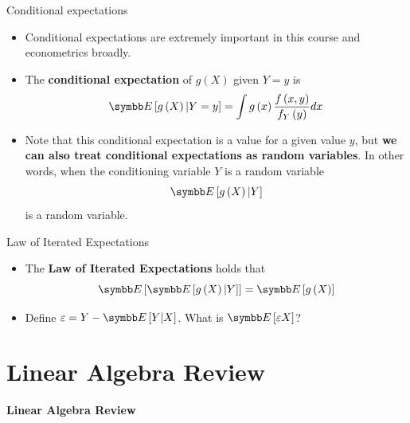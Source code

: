 \documentclass[aspectratio=169,11pt]{beamer}
\begin{document}
\begin{frame}{Conditional expectations}
\begin{itemize}
	\item Conditional expectations are extremely important in this course and econometrics broadly. 
	
	\medskip
	\item The {\bf conditional expectation} of $g\left(X\right)$ given $Y=y$ is\[
		\E\left[g\left( X\right) | Y=y\right] = \int g\left(x\right) \frac{f\left(x,y\right)}{f_{Y}\left(y\right)}dx
	\]
	
	\medskip
	\item Note that this conditional expectation is a value for a given value $y$, but {\bf we can also treat conditional
			expectations as random variables}. In other words, when the conditioning variable $Y$ is a random variable\[
			\E\left[g\left( X\right) | Y \right] 
			\]
			is a random variable.
			
\end{itemize}
\end{frame}





\begin{frame}{Law of Iterated Expectations}
\begin{itemize}
	\item The {\bf Law of Iterated Expectations} holds that\[
			\E\left[\E\left[g\left(X\right)|Y\right]\right] = \E\left[g\left(X\right)\right]
	\]
	
	\medskip
	\item Define $\varepsilon = Y - \E\left[Y|X\right]$. What is $\E\left[\varepsilon X\right]$?
\end{itemize}
\end{frame}



\section{Linear Algebra Review}

\begin{frame}

\begin{center}
	{\Large \bf Linear Algebra Review}	
\end{center}

\end{frame}
\end{document}
